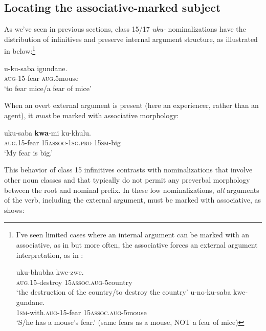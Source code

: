 \documentclass[output=paper,colorlinks,citecolor=brown]{langscibook}
\begin{document}
\subsection{Locating the associative-marked subject}\label{sec:halpert:3.1}

As we've seen in previous sections, class 15/17 \textit{uku-} nominalizations have the distribution of infinitives and preserve internal argument structure, as illustrated in  below:\footnote{I've seen limited cases where an internal argument can be marked with an associative, as in  but more often, the associative forces an external argument interpretation, as in :

\ea%
    \label{ex:halpert:fn1}
    \ea%
    \label{ex:halpert:fn1a}
    \gll    uku-bhubha kwe-zwe.\\
            \textsc{aug}.15-destroy 15\textsc{assoc}.\textsc{aug}-5country\\
    \glt    `the destruction of the country/to destroy the country'
    \ex%
    \label{ex:halpert:fn1b}
    \gll    u-no-ku-saba kwe-gundane.\\
            1\textsc{sm}-with.\textsc{aug}-15-fear 15\textsc{assoc}.\textsc{aug}-5mouse\\
    \glt    `S/he has a mouse's fear.' (same fears as a mouse, NOT a fear of mice)
    \z 
\z 
}

\ea%
    \label{ex:halpert:12} 
    \gll    u-ku-saba igundane.\\
            \textsc{aug}-15-fear \textsc{aug}.5mouse\\
    \glt    `to fear mice/a fear of mice'
\z 

When an overt external argument is present (here an experiencer, rather than an agent), it \textit{must} be marked with associative morphology:

\ea%
    \label{ex:halpert:13}
    \gll    uku-saba \textbf{kwa}-mi ku-khulu.\\
            \textsc{aug}.15-fear 15\textsc{assoc}-1\textsc{sg}.\textsc{pro} 15\textsc{sm}-big\\
    \glt    `My fear is big.'
\z 

This behavior of class 15 infinitives contrasts with nominalizations that involve other noun classes and that typically do not permit any preverbal morphology between the root and nominal prefix.  In these low nominalizations, \textit{all} arguments of the verb, including the external argument, must be marked with associative, as  shows:
\end{document}
